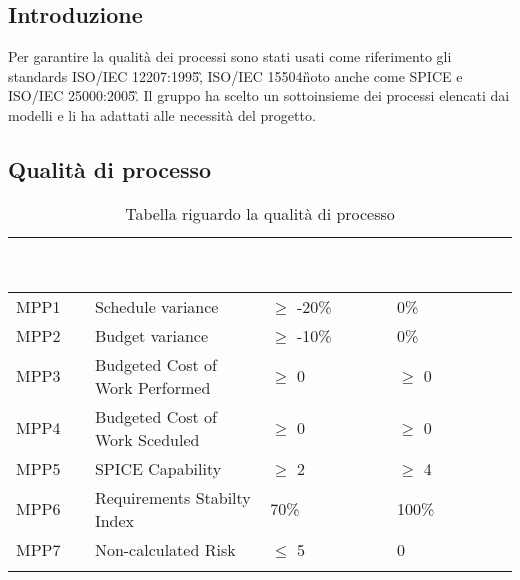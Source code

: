 \subsection{Introduzione}
Per garantire la qualità dei processi sono stati usati come riferimento gli standards 
ISO/IEC 12207:1995\G, ISO/IEC 15504\G noto anche come SPICE e ISO/IEC 25000:2005\G.
Il gruppo ha scelto un sottoinsieme dei processi elencati dai modelli e li ha adattati alle 
necessità del progetto.

\subsection{Qualità di processo}
{

    \setlength{\freewidth}{\dimexpr\textwidth-10\tabcolsep}
    \renewcommand{\arraystretch}{1.5}
    \centering
    \setlength{\aboverulesep}{0pt}
    \setlength{\belowrulesep}{0pt}
    \begin{longtable}{C{.257\freewidth} C{.257\freewidth} C{.257\freewidth} C{.257\freewidth}}
       \toprule
    \textcolor{white}{\textbf{Metrica}}&
    \textcolor{white}{\textbf{Nome}}&
    \textcolor{white}{\textbf{Valore accettabile}}&
    \textcolor{white}{\textbf{Valore preferibile}}\\	
    \toprule
    \endhead
    
    
    MPP1 & Schedule variance & $\geq$ -20\% & 0\% \\
    MPP2 & Budget variance & $\geq$ -10\% & 0\% \\
    MPP3 & Budgeted Cost of Work Performed & $\geq$ 0 & $\geq$ 0 \\
    MPP4 & Budgeted Cost of Work Sceduled & $\geq$ 0 & $\geq$ 0 \\
    MPP5 & SPICE Capability & $\geq$ 2 & $\geq$ 4 \\
    MPP6 & Requirements Stabilty Index & 70\% & 100\% \\
    MPP7 & Non-calculated Risk & $\leq$ 5 & 0 \\	   
    \bottomrule
    \caption{Tabella riguardo la qualità di processo}
    \end{longtable}
}

